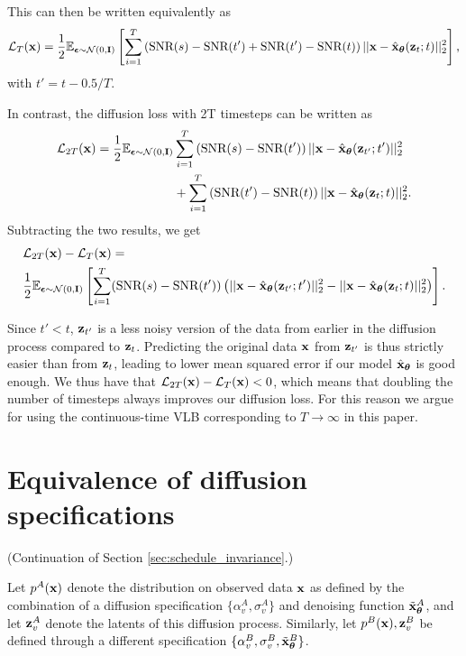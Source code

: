 \documentclass{article}
\newcommand{\lT}{\mathcal{L}_T(\rvx)}
\newcommand{\ldT}{\mathcal{L}_{2T}(\rvx)}
\newcommand{\snr}{\text{SNR}}
\begin{document}
This can then be written equivalently as
\begin{align}
\lT =
\frac{1}{2}\E_{\bepsilon \sim \mathcal{N}(0,\bfI)}
\left[\sum_{i=1}^T
\left(\snr(s)-\snr(t') + \snr(t')-\snr(t)\right)
||\rvx - \hat{\rvx}_{\bT}(\rvz_{t};t) ||_2^2 \right],
\end{align}
with $t' = t - 0.5/T$.

In contrast, the diffusion loss with 2T timesteps can be written as
\begin{align}
\ldT =
\frac{1}{2}\E_{\bepsilon \sim \mathcal{N}(0,\bfI)}
& \sum_{i=1}^T
\left(\snr(s)-\snr(t')\right)
||\rvx - \hat{\rvx}_{\bT}(\rvz_{t'};t') ||_2^2 \nonumber\\
&+ \sum_{i=1}^T
\left(\snr(t')-\snr(t)\right)
||\rvx - \hat{\rvx}_{\bT}(\rvz_{t};t) ||_2^2.
\end{align}
Subtracting the two results, we get
\begin{align}
&\ldT - \lT = \nonumber\\ &\frac{1}{2}\E_{\bepsilon \sim \mathcal{N}(0,\bfI)}
\left[\sum_{i=1}^T (\snr(s)-\snr(t')) \left(
||\rvx - \hat{\rvx}_{\bT}(\rvz_{t'};t') ||_2^2 - ||\rvx - \hat{\rvx}_{\bT}(\rvz_{t};t) ||_2^2 \right)\right].
\end{align}

Since $t' < t$, ${\mathbf{z}}_{t'}$ is a less noisy version of the data from earlier in the diffusion process compared to ${\mathbf{z}}_{t}$. Predicting the original data ${\mathbf{x}}$ from ${\mathbf{z}}_{t'}$ is thus strictly easier than from ${\mathbf{z}}_{t}$, leading to lower mean squared error if our model $\hat{\mathbf{x}}_{{\boldsymbol{\theta}}}$ is good enough. We thus have that $\ldT - \lT < 0$, which means that doubling the number of timesteps always improves our diffusion loss. For this reason we argue for using the continuous-time VLB corresponding to $T\rightarrow\infty$ in this paper.

\section{Equivalence of diffusion specifications}
\label{sec:app_equivalence}
%
(Continuation of Section \ref{sec:schedule_invariance}.)

Let $p^{A}({\mathbf{x}})$ denote the distribution on observed data ${\mathbf{x}}$ as defined by the combination of a diffusion specification $\{\alpha^A_v, \sigma^A_v\}$ and denoising function $\tilde{{\mathbf{x}}}^A_{{\boldsymbol{\theta}}}$, and let ${\mathbf{z}}^{A}_v$ denote the latents of this diffusion process. Similarly, let $p^{B}({\mathbf{x}}), {\mathbf{z}}^{B}_v$ be defined through a different specification $\{\alpha^B_v, \sigma^B_v, \tilde{{\mathbf{x}}}^B_{{\boldsymbol{\theta}}}\}$.
\end{document}
